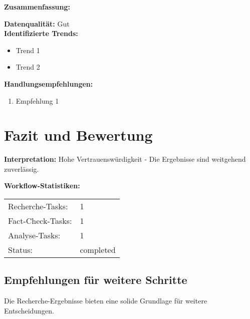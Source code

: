 \documentclass[12pt,a4paper]{article}
\begin{document}
\textbf{Zusammenfassung:}

\textbf{Datenqualität:} Gut\\

\textbf{Identifizierte Trends:}
\begin{itemize}
\item Trend 1
\item Trend 2
\end{itemize}

\textbf{Handlungsempfehlungen:}
\begin{enumerate}
\item Empfehlung 1
\end{enumerate}


\newpage
\section{Fazit und Bewertung}


\textbf{Interpretation:} Hohe Vertrauenswürdigkeit - Die Ergebnisse sind weitgehend zuverlässig.

\textbf{Workflow-Statistiken:}
\begin{tabular}{ll}
Recherche-Tasks: & 1 \\
Fact-Check-Tasks: & 1 \\
Analyse-Tasks: & 1 \\
Status: & completed \\
\end{tabular}

\subsection{Empfehlungen für weitere Schritte}

Die Recherche-Ergebnisse bieten eine solide Grundlage für weitere Entscheidungen.
\end{document}
